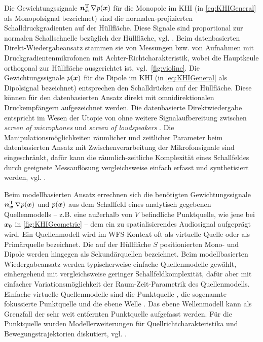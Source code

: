 Die Gewichtungssignale $\bm{n}^\mathrm{T}_{\bm{x}} \, \nabla p(\bm{x})$ für die Monopole im KHI
(in \Glg\eqref{eq:KHIGeneral} als Monopolsignal bezeichnet)
sind die normalen-projizierten Schalldruckgradienten auf der Hüllfläche.
%
Diese Signale sind proportional zur normalen Schallschnelle bezüglich der Hüllfläche,
vgl. \cite{Berkhout1993_JASA, Vries1996_JAES}.
%
Beim datenbasierten Direkt-Wiedergabeansatz stammen sie von
Messungen bzw. von Aufnahmen mit Druckgradientenmikrofonen
mit Achter-Richtcharakteristik, wobei die Hauptkeule
orthogonal zur Hüllfläche ausgerichtet ist, vgl.~\Abb\ref{fig:violine}.
%
Die Gewichtungssignale $p(\bm{x})$ für die Dipole im KHI (in
\Glg\eqref{eq:KHIGeneral} als Dipolsignal bezeichnet)
entsprechen den Schalldrücken auf der Hüllfläche.
%
Diese können für den datenbasierten Ansatz direkt mit omnidirektionalen
Druckempfängern aufgezeichnet werden.
%
Die datenbasierte Direktwiedergabe entspricht im Wesen der Utopie
von \cite{Fletcher1934,Steinberg1934} ohne weitere
Signalaufbereitung zwischen \textit{screen of microphones} und
\textit{screen of loudspeakers} \cite[S.\,572]{Snow1953}.
%
Die Manipulationsmöglichkeiten räumlicher und zeitlicher Parameter beim
datenbasierten Ansatz mit Zwischenverarbeitung der Mikrofonsignale sind
eingeschränkt, dafür kann die räumlich-zeitliche Komplexität eines
Schallfeldes durch geeignete Messauflösung vergleichsweise
einfach erfasst und synthetisiert
werden, vgl. \cite{Sonke2000_diss,Hulsebos2004_diss,Vries2007_JASP}.



Beim modellbasierten Ansatz errechnen sich die benötigten Gewichtungssignale
$\bm{n}^\mathrm{T}_{\bm{x}} \, \nabla p(\bm{x})$ und $p(\bm{x})$ aus dem Schallfeld eines analytisch
gegebenen Quellenmodells -- z.B. eine außerhalb von $V$ befindliche Punktquelle,
wie jene bei $\bm{x}_\mathrm{0}$ in \Abb\ref{fig:KHIGeometrie} -- dem ein zu spatialisierendes
Audiosignal aufgeprägt wird.
%
Ein Quellenmodell wird im WFS-Kontext oft als virtuelle Quelle oder als
Primärquelle bezeichnet.
%
Die auf der Hüllfläche $S$ positionierten Mono- und Dipole werden hingegen
als Sekundärquellen bezeichnet.
%
Beim modellbasierten Wiedergabeansatz
werden typischerweise einfache Quellenmodelle gewählt, einhergehend mit vergleichsweise
geringer Schallfeldkomplexität, dafür aber mit einfacher Variationsmöglichkeit
der Raum-Zeit-Parametrik des Quellenmodells.
%
Einfache virtuelle Quellenmodelle sind die
Punktquelle \cite{Berkhout1993_JASA,Start1997_diss},
die sogenannte fokussierte Punktquelle \cite{Verheijen1997_diss,Spors2007b,Melchior2008,Wierstorf2014_diss}
und die ebene Welle \cite{Spors2008a, Voelk2012, Firtha2019_diss}.
%
Das ebene Wellenmodell kann als Grenzfall der sehr weit
entfernten Punktquelle aufgefasst werden.
%
Für die Punktquelle wurden Modellerweiterungen für Quellrichtcharakteristika und
Bewegungstrajektorien diskutiert, vgl. \cite{Corteel2007_JASP,Baalman2008_diss,Franck2012,Romoli2015_ApplAc,Schultz2017,Franck2007,Ahrens2011,Firtha2019_diss}.



